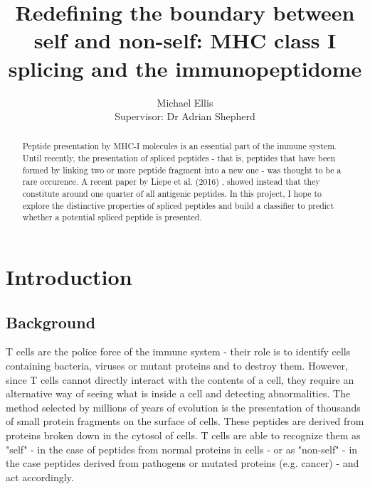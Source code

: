 \documentclass[10pt,a4paper,twoside,twocolumn]{article}
\begin{document}
\author{Michael Ellis\\[0cm]{\small Supervisor: Dr Adrian Shepherd}}
\date{}
\title{Redefining the boundary between self and non-self: MHC class I splicing and the immunopeptidome}


\maketitle
\newpage
\onecolumn
\begin{abstract}
	Peptide presentation by MHC-I molecules is an essential part of the immune system. Until recently, the presentation of spliced peptides - that is, peptides that have been formed by linking two or more peptide fragment into a new one - was thought to be a rare occurence. A recent paper by Liepe et al. (2016) \cite{Liepe2016}, showed instead that they constitute around one quarter of all antigenic peptides. In this project, I hope to explore the distinctive properties of spliced peptides and build a classifier to predict whether a potential spliced peptide is presented.
\end{abstract}

\newpage
\tableofcontents
\twocolumn
{}
\section*{Introduction}


\subsection*{Background}

T cells are the police force of the immune system - their role is to identify cells containing bacteria, viruses or mutant proteins and to destroy them. However, since T cells cannot directly interact with the contents of a cell, they require an alternative way of seeing what is inside a cell and detecting abnormalities. The method selected by millions of years of evolution is the presentation of thousands of small protein fragments on the surface of cells. These peptides are derived from proteins broken down in the cytosol of cells. T cells are able to recognize them as "self" - in the case of peptides from normal proteins in cells - or as "non-self" - in the case peptides derived from pathogens or mutated proteins (e.g. cancer) - and act accordingly. 
\end{document}
